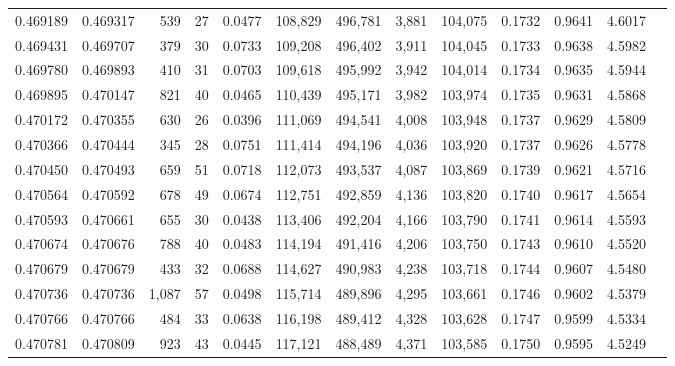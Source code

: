 \begin{tabular}{rrrrrrrrrrrrr}
0.469189 & 0.469317 &   539 &    27 &                                     0.0477 & 108,829 & 496,781 &   3,881 & 104,075 & 0.1732 & 0.9641 & 4.6017 \\
0.469431 & 0.469707 &   379 &    30 &                                     0.0733 & 109,208 & 496,402 &   3,911 & 104,045 & 0.1733 & 0.9638 & 4.5982 \\
0.469780 & 0.469893 &   410 &    31 &                                     0.0703 & 109,618 & 495,992 &   3,942 & 104,014 & 0.1734 & 0.9635 & 4.5944 \\
0.469895 & 0.470147 &   821 &    40 &                                     0.0465 & 110,439 & 495,171 &   3,982 & 103,974 & 0.1735 & 0.9631 & 4.5868 \\
0.470172 & 0.470355 &   630 &    26 &                                     0.0396 & 111,069 & 494,541 &   4,008 & 103,948 & 0.1737 & 0.9629 & 4.5809 \\
0.470366 & 0.470444 &   345 &    28 &                                     0.0751 & 111,414 & 494,196 &   4,036 & 103,920 & 0.1737 & 0.9626 & 4.5778 \\
0.470450 & 0.470493 &   659 &    51 &                                     0.0718 & 112,073 & 493,537 &   4,087 & 103,869 & 0.1739 & 0.9621 & 4.5716 \\
0.470564 & 0.470592 &   678 &    49 &                                     0.0674 & 112,751 & 492,859 &   4,136 & 103,820 & 0.1740 & 0.9617 & 4.5654 \\
0.470593 & 0.470661 &   655 &    30 &                                     0.0438 & 113,406 & 492,204 &   4,166 & 103,790 & 0.1741 & 0.9614 & 4.5593 \\
0.470674 & 0.470676 &   788 &    40 &                                     0.0483 & 114,194 & 491,416 &   4,206 & 103,750 & 0.1743 & 0.9610 & 4.5520 \\
0.470679 & 0.470679 &   433 &    32 &                                     0.0688 & 114,627 & 490,983 &   4,238 & 103,718 & 0.1744 & 0.9607 & 4.5480 \\
0.470736 & 0.470736 & 1,087 &    57 &                                     0.0498 & 115,714 & 489,896 &   4,295 & 103,661 & 0.1746 & 0.9602 & 4.5379 \\
0.470766 & 0.470766 &   484 &    33 &                                     0.0638 & 116,198 & 489,412 &   4,328 & 103,628 & 0.1747 & 0.9599 & 4.5334 \\
0.470781 & 0.470809 &   923 &    43 &                                     0.0445 & 117,121 & 488,489 &   4,371 & 103,585 & 0.1750 & 0.9595 & 4.5249 \\

\end{tabular}
